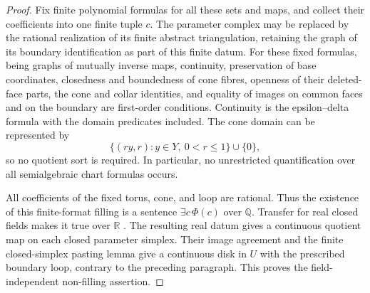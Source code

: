 \begin{proof}
Fix finite polynomial formulas for all these sets and maps,
and collect their coefficients into one finite tuple $c$.
The parameter complex may be replaced by the rational realization
of its finite abstract triangulation, retaining the graph of its
boundary identification as part of this finite datum.
For these fixed formulas, being graphs of mutually inverse maps,
continuity, preservation of base coordinates, closedness and
boundedness of cone fibres, openness of their deleted-face parts,
the cone and collar identities, and equality of images on common
faces and on the boundary are first-order conditions.
Continuity is the epsilon--delta formula with the domain
predicates included.  The cone domain can be represented by
\[
 \{(ry,r):y\in Y,\ 0<r\leq1\}\cup\{0\},
\]
so no quotient sort is required.  In particular, no unrestricted
quantification over all semialgebraic chart formulas occurs.

All coefficients of the fixed torus, cone, and loop are rational.
Thus the existence of this finite-format filling is a sentence
$\exists c\,\Phi(c)$ over $\mathbb Q$.
Transfer for real closed fields makes it true over $\mathbb R$
\cite[Theorems~2.80--2.81]{BasuPollackRoy2006}.
The resulting real datum gives a continuous quotient map on each
closed parameter simplex.  Their image agreement and the finite
closed-simplex pasting lemma give a continuous disk in $U$ with
the prescribed boundary loop, contrary to the preceding paragraph.
This proves the field-independent non-filling assertion.
\end{proof}
